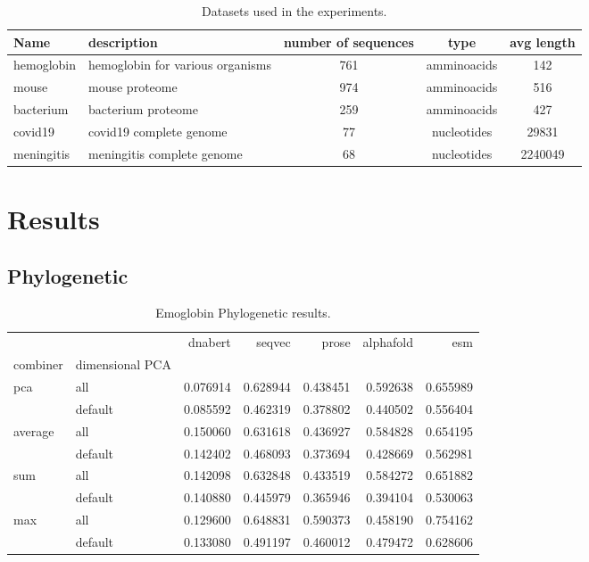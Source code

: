 \documentclass[12pt, letterpaper, twocolumn]{article}
\begin{document}
\begin{table*}[htb]
\centering
\begin{tabular}{|p{3cm} p{3cm} c c c |} 
    \hline
    Name & description & number of sequences & type & avg length   \\ 
    \hline
    hemoglobin &  hemoglobin for various organisms & 761 & amminoacids & 142  \\
    \hline
    mouse & mouse proteome     & 974 & amminoacids & 516 \\
    \hline
    bacterium & bacterium proteome  & 259 &  amminoacids & 427  \\
    \hline
    covid19 & covid19 complete genome & 77 & nucleotides & 29831  \\
    \hline
    meningitis & meningitis complete genome & 68 & nucleotides & 2240049 \\
    \hline
\end{tabular}
\caption{Datasets used in the experiments.}
\label{tab:dataset}
\end{table*}





\section{Results}
\subsection{Phylogenetic}



\begin{table*}[hbt]
    \begin{tabular}{llrrrrr}
        \toprule
         &  & dnabert & seqvec & prose & alphafold & esm \\
        combiner & dimensional PCA &  &  &  &  &  \\
        \midrule
        \multirow[t]{2}{*}{pca} & all & 0.076914 & 0.628944 & 0.438451 & 0.592638 & 0.655989 \\
         & default & 0.085592 & 0.462319 & 0.378802 & 0.440502 & 0.556404 \\
        \cline{1-7}
        \multirow[t]{2}{*}{average} & all & 0.150060 & 0.631618 & 0.436927 & 0.584828 & 0.654195 \\
         & default & 0.142402 & 0.468093 & 0.373694 & 0.428669 & 0.562981 \\
        \cline{1-7}
        \multirow[t]{2}{*}{sum} & all & 0.142098 & 0.632848 & 0.433519 & 0.584272 & 0.651882 \\
         & default & 0.140880 & 0.445979 & 0.365946 & 0.394104 & 0.530063 \\
        \cline{1-7}
        \multirow[t]{2}{*}{max} & all & 0.129600 & 0.648831 & 0.590373 & 0.458190 & 0.754162 \\
         & default & 0.133080 & 0.491197 & 0.460012 & 0.479472 & 0.628606 \\
        \cline{1-7}
        \bottomrule
        \end{tabular}
\caption{Emoglobin Phylogenetic results.}
\label{tab:emoglobin_phylo_results}
\end{table*}
\end{document}

